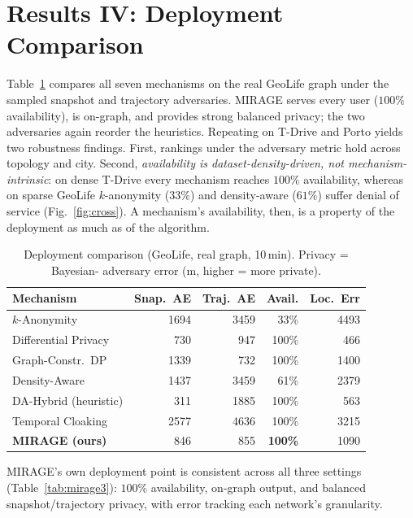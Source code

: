 \documentclass[11pt]{article}
\begin{document}
\section{Results IV: Deployment Comparison}
\label{sec:deploy}
Table~\ref{tab:main} compares all seven mechanisms on the real GeoLife graph under
the sampled snapshot and trajectory adversaries. MIRAGE serves every user
($100\%$ availability), is on-graph, and provides strong balanced privacy; the two
adversaries again reorder the heuristics. Repeating on T-Drive and Porto yields two
robustness findings. First, rankings under the adversary metric hold across
topology and city. Second, \emph{availability is dataset-density-driven, not
mechanism-intrinsic}: on dense T-Drive every mechanism reaches $100\%$
availability, whereas on sparse GeoLife $k$-anonymity ($33\%$) and density-aware
($61\%$) suffer denial of service (Fig.~\ref{fig:cross}). A mechanism's
availability, then, is a property of the deployment as much as of the algorithm.

\begin{table}[t]\centering
\caption{Deployment comparison (GeoLife, real graph, 10\,min). Privacy = Bayesian-
adversary error (m, higher = more private).}
\label{tab:main}
\begin{tabular}{lrrrr}
\toprule
Mechanism & Snap.\ AE & Traj.\ AE & Avail. & Loc.\ Err \\
\midrule
$k$-Anonymity & 1694 & 3459 & 33\% & 4493 \\
Differential Privacy & 730 & 947 & 100\% & 466 \\
Graph-Constr.\ DP & 1339 & 732 & 100\% & 1400 \\
Density-Aware & 1437 & 3459 & 61\% & 2379 \\
DA-Hybrid (heuristic) & 311 & 1885 & 100\% & 563 \\
Temporal Cloaking & 2577 & 4636 & 100\% & 3215 \\
\textbf{MIRAGE (ours)} & 846 & 855 & \textbf{100\%} & 1090 \\
\bottomrule
\end{tabular}
\end{table}

MIRAGE's own deployment point is consistent across all three settings
(Table~\ref{tab:mirage3}): $100\%$ availability, on-graph output, and balanced
snapshot/trajectory privacy, with error tracking each network's granularity.
\end{document}
